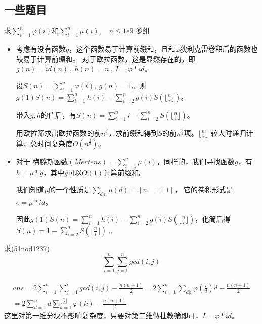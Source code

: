 \subsection{一些题目}
\begin{example}
求$\sum_{i=1}^n\varphi(i)$和$\sum_{i=1}^n\mu(i),\quad n\le 1e9$  \quad 多组
\end{example}
\begin{solution}
\begin{itemize}
\item 考虑有没有函数$g$，这个函数易于计算前缀和，且和$\varphi$狄利克雷卷积后的函数也较易于计算前缀和。
对于欧拉函数，这是显然存在的，即$g(n)=id(n)\ ,\ h(n)=n\ ,\ I = \varphi * id$。 

设$S(n)=\sum_{i=1}^n\varphi(i),\ g(n)=1$。则$g(1)S(n)=\sum_{i=1}^nh(i)-\sum_{i=2}^ng(i)S(\lfloor \frac{n}{i}\rfloor)$。 

带入$g,h$的值后，有$S(n)=\sum_{i=1}^ni-\sum_{i=2}^nS(\lfloor \frac{n}{i}\rfloor)$。

用欧拉筛求出欧拉函数的前$n^{\frac{2}{3}}$，求前缀和得到$S$的前$n^{\frac{2}{3}}$项。$\lfloor \frac{n}{i}\rfloor$ 较大时递归计算，总时间复杂度$O(n^\frac{2}{3})$。

\item 对于 $梅滕斯函数(Mertens)=\sum_{i=1}^n\mu(i)$，同样的，我们寻找函数$g$，有$h=\mu*g$，其中$g$可以$O(1)$计算前缀和。

我们知道$\mu$的一个性质是$\sum_{d|n}\mu(d)=[n==1]$，  它的卷积形式是$e=\mu * id$。

因此$g(1)S(n)=\sum_{i=1}^nh(i)-\sum_{i=2}^ng(i)S(\lfloor \frac{n}{i}\rfloor)$，化简后得$S(n)=1-\sum_{i=2}^nS(\lfloor \frac{n}{i}\rfloor)$  。
\end{itemize}
\end{solution}


\vbox{}


\begin{example}
求\quad (51nod1237)
$$
\sum_{i=1}^{n}\sum_{j=1}^{n}gcd(i,j)
$$

\end{example}
\begin{solution}
\label{exa:dujiao1}
\begin{align*}
ans=2\sum_{i=1}^n\sum_{j=1}^igcd(i,j)-\frac {n(n+1)}{ 2}=2\sum_{i=1}^n\sum_{d|i}\varphi(\frac i d)d-\frac {n(n+1)}{ 2} \\ =2\sum_{d=1}^nd\sum_{k=1}^{\lfloor \frac n d \rfloor}\varphi(k)  -\frac {n(n+1)}{ 2}
\end{align*}
这里对第一维分块不影响复杂度，只要对第二维做杜教筛即可，$I=\varphi * id$。
\end{solution}


